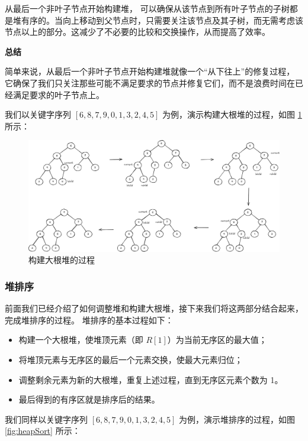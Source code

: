 \documentclass[lang=cn,newtx,10pt,scheme=chinese]{../elegantbook}
\begin{document}
   从最后一个非叶子节点开始构建堆，
   可以确保从该节点到所有叶子节点的子树都是堆有序的。当向上移动到父节点时，只需要关注该节点及其子树，而无需考虑该节点以上的部分。这减少了不必要的比较和交换操作，从而提高了效率。


\textbf{总结}  

简单来说，从最后一个非叶子节点开始构建堆就像一个“从下往上”的修复过程，
它确保了我们只关注那些可能不满足要求的节点并修复它们，而不是浪费时间在已经满足要求的叶子节点上。


我们以关键字序列 $[6,8,7,9,0,1,3,2,4,5]$ 为例，演示构建大根堆的过程，如图 \ref{fig:heapBuild} 所示：

\begin{figure}[!htbp]
    \centering
    \includegraphics[width=1\textwidth]{./figure/pdf/cropped/heapBuild.pdf}
    \caption{构建大根堆的过程}
    \label{fig:heapBuild}
\end{figure}


\subsubsection{堆排序}

前面我们已经介绍了如何调整堆和构建大根堆，接下来我们将这两部分结合起来，完成堆排序的过程。
堆排序的基本过程如下：
\begin{itemize}
  \item 构建一个大根堆，使堆顶元素（即 $R[1]$）为当前无序区的最大值；
  \item 将堆顶元素与无序区的最后一个元素交换，使最大元素归位；
  \item 调整剩余元素为新的大根堆，重复上述过程，直到无序区元素个数为 1。
  \item 最后得到的有序区就是排序后的结果。
  \end{itemize}
我们同样以关键字序列 $[6,8,7,9,0,1,3,2,4,5]$ 为例，演示堆排序的过程，如图 \ref{fig:heapSort} 所示：
\end{document}
